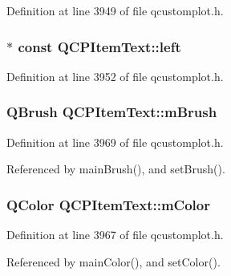 Definition at line 3949 of file qcustomplot.\+h.

\hypertarget{class_q_c_p_item_text_ab8c6c6e1df36256986fab1463c0a1d38}{}
\subsubsection[{left}]{$\ast$ const Q\+C\+P\+Item\+Text\+::left}\label{class_q_c_p_item_text_ab8c6c6e1df36256986fab1463c0a1d38}


Definition at line 3952 of file qcustomplot.\+h.

\hypertarget{class_q_c_p_item_text_a2535911875faa459b8337f2efccb5cb8}{}
\subsubsection[{m\+Brush}]{\setlength{\rightskip}{0pt plus 5cm}Q\+Brush Q\+C\+P\+Item\+Text\+::m\+Brush\hspace{0.3cm}{\ttfamily [protected]}}\label{class_q_c_p_item_text_a2535911875faa459b8337f2efccb5cb8}


Definition at line 3969 of file qcustomplot.\+h.



Referenced by main\+Brush(), and set\+Brush().

\hypertarget{class_q_c_p_item_text_a8407f284ad867f627878cc26ef433d08}{}
\subsubsection[{m\+Color}]{\setlength{\rightskip}{0pt plus 5cm}Q\+Color Q\+C\+P\+Item\+Text\+::m\+Color\hspace{0.3cm}{\ttfamily [protected]}}\label{class_q_c_p_item_text_a8407f284ad867f627878cc26ef433d08}


Definition at line 3967 of file qcustomplot.\+h.



Referenced by main\+Color(), and set\+Color().

\hypertarget{class_q_c_p_item_text_a1dc87fe2a824820d549ffd7e644eef8d}{}
